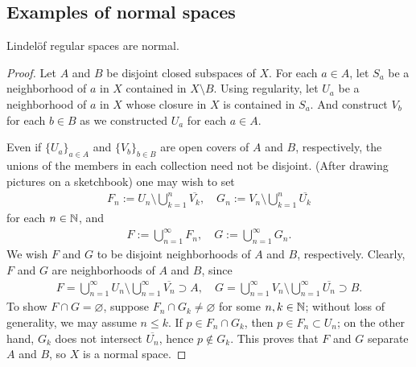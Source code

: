 \subsection{Examples of normal spaces}
\begin{thm}
    Lindel\"{o}f regular spaces are normal.
\end{thm}
\begin{proof}
    Let $A$ and $B$ be disjoint closed subspaces of $X$.
    For each $a\in A$, let $S_a$ be a neighborhood of $a$ in $X$ contained in $X\setminus B$.
    Using regularity, let $U_a$ be a neighborhood of $a$ in $X$ whose closure in $X$ is contained in $S_a$.
    And construct $V_b$ for each $b\in B$ as we constructed $U_a$ for each $a\in A$.

    Even if $\{U_a\}_{a\in A}$ and $\{V_b\}_{b\in B}$ are open covers of $A$ and $B$, respectively, the unions of the members in each collection need not be disjoint.
    (After drawing pictures on a sketchbook) one may wish to set
    \begin{align*}
        F_n:=U_n\setminus\bigcup_{k=1}^n\overline{V_k},\quad G_n:=V_n\setminus\bigcup_{k=1}^n\overline{U_k}
    \end{align*}
    for each $n\in{\mathbb{N}}$, and
    \begin{align*}
        F:=\bigcup_{n=1}^\infty F_n,\quad G:=\bigcup_{n=1}^\infty G_n.
    \end{align*}
    We wish $F$ and $G$ to be disjoint neighborhoods of $A$ and $B$, respectively.
    Clearly, $F$ and $G$ are neighborhoods of $A$ and $B$, since
    \begin{align*}
        F=\bigcup_{n=1}^\infty U_n\setminus\bigcup_{n=1}^\infty\overline{V_n}\supset A,\quad G=\bigcup_{n=1}^\infty V_n\setminus\bigcup_{n=1}^\infty\overline{U_n}\supset B.
    \end{align*}
    To show $F\cap G=\varnothing$, suppose $F_n\cap G_k\neq\varnothing$ for some $n, k\in{\mathbb{N}}$; without loss of generality, we may assume $n\leq k$.
    If $p\in F_n\cap G_k$, then $p\in F_n\subset U_n$; on the other hand, $G_k$ does not intersect $\overline{U_n}$, hence $p\notin G_k$.
    This proves that $F$ and $G$ separate $A$ and $B$, so $X$ is a normal space.
\end{proof}

